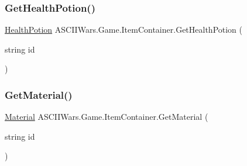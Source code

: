 \hypertarget{class_a_s_c_i_i_wars_1_1_game_1_1_item_container_a449041c4df0b261569597be88277d92b}{}\label{class_a_s_c_i_i_wars_1_1_game_1_1_item_container_a449041c4df0b261569597be88277d92b} 
\subsubsection{\texorpdfstring{Get\+Health\+Potion()}{GetHealthPotion()}}
{\footnotesize\ttfamily \hyperlink{class_a_s_c_i_i_wars_1_1_game_1_1_health_potion}{Health\+Potion} A\+S\+C\+I\+I\+Wars.\+Game.\+Item\+Container.\+Get\+Health\+Potion (\begin{DoxyParamCaption}\item[{string}]{id }\end{DoxyParamCaption})\hspace{0.3cm}{\ttfamily [inline]}}

\hypertarget{class_a_s_c_i_i_wars_1_1_game_1_1_item_container_a75b28ef2b5ae3acfceeb787c95eeb34b}{}\label{class_a_s_c_i_i_wars_1_1_game_1_1_item_container_a75b28ef2b5ae3acfceeb787c95eeb34b} 
\subsubsection{\texorpdfstring{Get\+Material()}{GetMaterial()}}
{\footnotesize\ttfamily \hyperlink{class_a_s_c_i_i_wars_1_1_game_1_1_material}{Material} A\+S\+C\+I\+I\+Wars.\+Game.\+Item\+Container.\+Get\+Material (\begin{DoxyParamCaption}\item[{string}]{id }\end{DoxyParamCaption})\hspace{0.3cm}{\ttfamily [inline]}}

\hypertarget{class_a_s_c_i_i_wars_1_1_game_1_1_item_container_aae0cb532c9242a5673e80eaff7b3edbd}{}\label{class_a_s_c_i_i_wars_1_1_game_1_1_item_container_aae0cb532c9242a5673e80eaff7b3edbd} 
